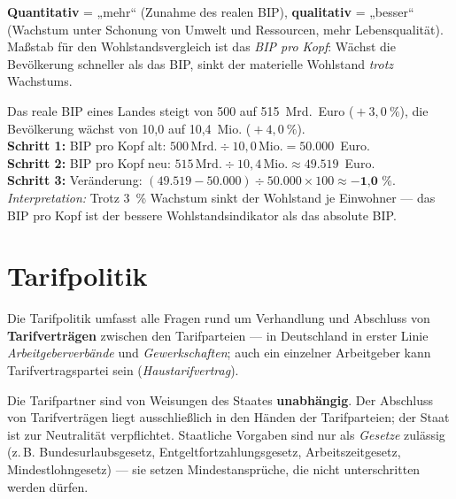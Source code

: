 \documentclass[11pt, a4paper]{article}
\begin{document}
\begin{merksatz}
\textbf{Quantitativ} = „mehr`` (Zunahme des realen BIP), \textbf{qualitativ} = „besser``
(Wachstum unter Schonung von Umwelt und Ressourcen, mehr Lebensqualität). Maßstab für den
Wohlstandsvergleich ist das \emph{BIP pro Kopf}: Wächst die Bevölkerung schneller als das
BIP, sinkt der materielle Wohlstand \emph{trotz} Wachstums.
\end{merksatz}

\begin{beispiel}
Das reale BIP eines Landes steigt von 500 auf 515~Mrd.~Euro (${}+3{,}0~\%$), die
Bevölkerung wächst von 10,0 auf 10,4~Mio. (${}+4{,}0~\%$).\\[0.3em]
\textbf{Schritt 1:} BIP pro Kopf alt: $500\,\text{Mrd.} \div 10{,}0\,\text{Mio.}
= 50.000$~Euro.\\
\textbf{Schritt 2:} BIP pro Kopf neu: $515\,\text{Mrd.} \div 10{,}4\,\text{Mio.}
\approx 49.519$~Euro.\\
\textbf{Schritt 3:} Veränderung: $(49.519 - 50.000) \div 50.000 \times 100 \approx
\textbf{$-$1{,}0~\%}$.\\[0.3em]
\emph{Interpretation:} Trotz 3~\% Wachstum sinkt der Wohlstand je Einwohner --- das BIP
pro Kopf ist der bessere Wohlstandsindikator als das absolute BIP.
\end{beispiel}

\section{Tarifpolitik}

Die Tarifpolitik umfasst alle Fragen rund um Verhandlung und Abschluss von
\textbf{Tarifverträgen} zwischen den Tarifparteien --- in Deutschland in erster Linie
\emph{Arbeitgeberverbände} und \emph{Gewerkschaften}; auch ein einzelner Arbeitgeber kann
Tarifvertragspartei sein (\emph{Haustarifvertrag}).

\begin{merksatz}[title={\bfseries Tarifautonomie (Art. 9 Abs. 3 GG)}]
Die Tarifpartner sind von Weisungen des Staates \textbf{unabhängig}. Der Abschluss von
Tarifverträgen liegt ausschließlich in den Händen der Tarifparteien; der Staat ist zur
Neutralität verpflichtet. Staatliche Vorgaben sind nur als \emph{Gesetze} zulässig
(z.\,B. Bundesurlaubsgesetz, Entgeltfortzahlungsgesetz, Arbeitszeitgesetz,
Mindestlohngesetz) --- sie setzen Mindestansprüche, die nicht unterschritten werden dürfen.
\end{merksatz}
\end{document}
